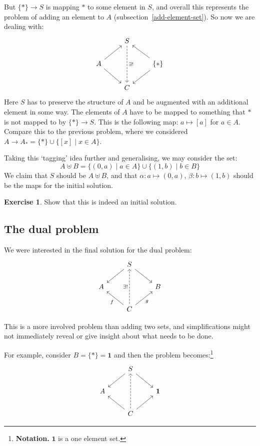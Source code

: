 \documentclass[a4paper, 12pt]{article}
\theoremstyle{definition}
\newtheorem{exercise}{Exercise}
\newcommand{\setof}[1]{ \{ #1 \} }
\newcommand{\suchthat}{\mid}
\newcommand{\union}{\cup}
\newcommand{\nelem}[1]{ \mathbf{ #1 } }
\begin{document}
But $\setof{\ast} \to S$ is mapping $\ast$ to some element in $S$, and overall
this represents the problem of adding an element to $A$
(subsection~\ref{add-element-set}). So now we are dealing with:
$$
\begin{tikzcd}
    {} & S \arrow[dd, dashed, "\exists!"] & {} \\
    A \arrow[ru] \arrow[rd]
    & {}
    &
    \setof{\ast} \arrow[lu] \arrow[ld]
    \\
    {} & C & {}
\end{tikzcd}
$$
Here $S$ has to preserve the structure of $A$ and be augmented with an
additional element in some way. The elements of $A$ have to be mapped to
something that $\ast$ is not mapped to by $\setof{\ast} \to S$. This is
the following map: $a \mapsto [a]$ for $a \in A$. Compare this to the previous
problem, where we considered $A \to A_\ast = \setof{\ast} \union \setof{[x]
\suchthat x \in A}$.

Taking this `tagging' idea further and generalising, we may consider the set:
$$
A \uplus B = \setof{(0, a) \suchthat a \in A} \union
\setof{(1, b) \suchthat b \in B}
$$
We claim that $S$ should be $A \uplus B$, and that $\alpha: a \mapsto (0, a)$,
$\beta: b \mapsto (1, b)$ should be the maps for the initial solution.

\begin{exercise}
Show that this is indeed an initial solution.
\end{exercise}

\subsection{The dual problem}

We were interested in the final solution for the dual problem:
$$
\begin{tikzcd}
    {} & S \arrow[ld] \arrow[rd] & {} \\
    A
    & {}
    &
    B
    \\
    {} & C \arrow[uu, dashed, "\exists!"] \arrow[lu, "f"] \arrow[ru, swap, "g"] & {}
\end{tikzcd}
$$

This is a more involved problem than adding two sets, and simplifications might
not immediately reveal or give insight about what needs to be done.

For example, consider $B = \setof{\ast} = \nelem{1}$ and then the problem
becomes:\footnote{\textbf{Notation.} $\nelem{1}$ is a one element set.}
$$
\begin{tikzcd}
    {} & S \arrow[ld] \arrow[rd] & {} \\
    A
    & {}
    &
    \nelem{1}
    \\
    {} & C \arrow[uu, dashed] \arrow[lu] \arrow[ru] & {}
\end{tikzcd}
$$
\end{document}
